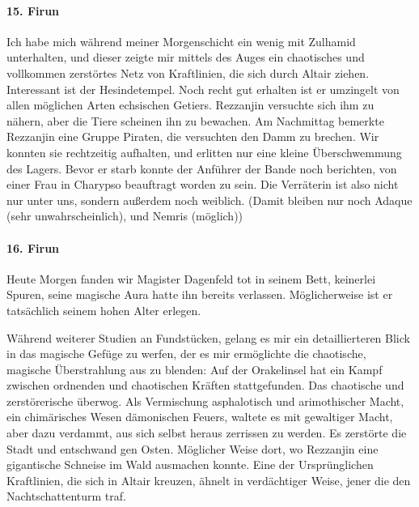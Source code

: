\paragraph{15. Firun}
Ich habe mich während meiner Morgenschicht ein wenig mit Zulhamid unterhalten, und dieser zeigte mir mittels des Auges ein chaotisches und vollkommen zerstörtes Netz von Kraftlinien, die sich durch Altair ziehen.
Interessant ist der Hesindetempel. Noch recht gut erhalten ist er umzingelt von allen möglichen Arten echsischen Getiers. Rezzanjin versuchte sich ihm zu nähern, aber die Tiere scheinen ihn zu bewachen.
Am Nachmittag bemerkte Rezzanjin eine Gruppe Piraten, die versuchten den Damm zu brechen. Wir konnten sie rechtzeitig aufhalten, und erlitten nur eine kleine Überschwemmung des Lagers. Bevor er starb konnte der Anführer der Bande noch berichten, von einer Frau in Charypso beauftragt worden zu sein. Die Verräterin ist also nicht nur unter uns, sondern außerdem noch weiblich. (Damit bleiben nur noch Adaque (sehr unwahrscheinlich), und Nemris (möglich))

\paragraph{16. Firun}
Heute Morgen fanden wir Magister Dagenfeld tot in seinem Bett, keinerlei Spuren, seine magische Aura hatte ihn bereits verlassen. Möglicherweise ist er tatsächlich seinem hohen Alter erlegen.

Während weiterer Studien an Fundstücken, gelang es mir ein detaillierteren Blick in das magische Gefüge zu werfen, der es mir ermöglichte die chaotische, magische Überstrahlung aus zu blenden: Auf der Orakelinsel hat ein Kampf zwischen ordnenden und chaotischen Kräften stattgefunden. Das chaotische und zerstörerische überwog. Als Vermischung asphalotisch und arimothischer Macht, ein chimärisches Wesen dämonischen Feuers, waltete es mit gewaltiger Macht, aber dazu verdammt, aus sich selbst heraus zerrissen zu werden. Es zerstörte die Stadt und entschwand gen Osten. Möglicher Weise dort, wo Rezzanjin eine gigantische Schneise im Wald ausmachen konnte. Eine der Ursprünglichen Kraftlinien, die sich in Altair kreuzen, ähnelt in verdächtiger Weise, jener die den Nachtschattenturm traf.

